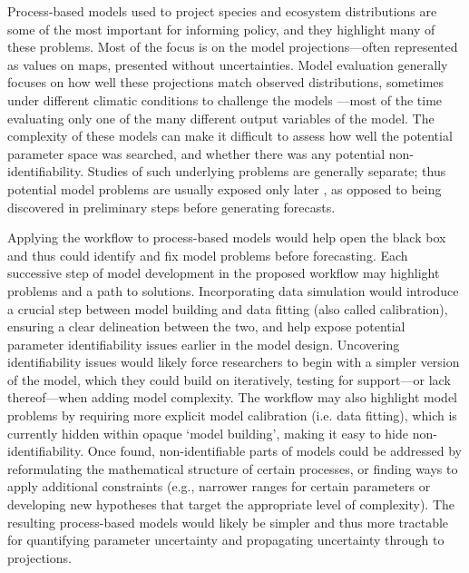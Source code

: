 \documentclass[11pt]{article}
\begin{document}
Process-based models used to project species and ecosystem distributions are some of the most important for informing policy, and they highlight many of these problems. Most of the focus is on the model projections---often represented as values on maps, presented without uncertainties. Model evaluation generally focuses on how well these projections match observed distributions, sometimes under different climatic conditions to challenge the models \citep{VanderMeersch2025a}---most of the time evaluating only one of the many different output variables of the model.
The complexity of these models can make it difficult to assess how well the potential parameter space was searched, and whether there was any potential non-identifiability. Studies of such underlying problems are generally separate; thus potential model problems are usually exposed only later \citep{VanderMeersch2025b}, as opposed to being discovered in preliminary steps before generating forecasts. 

Applying the workflow to process-based models would help open the black box and thus could identify and fix model problems before forecasting.
Each successive step of model development in the proposed workflow may highlight problems and a path to solutions. Incorporating data simulation would introduce a crucial step between model building and data fitting (also called calibration), ensuring a clear delineation between the two, and help expose potential parameter identifiability issues earlier in the model design. 
Uncovering identifiability issues would likely force researchers to begin with a simpler version of the model, which they could build on iteratively, testing for support---or lack thereof---when adding model complexity. The workflow may also highlight model problems by requiring more explicit model calibration (i.e. data fitting), which is currently hidden within opaque `model building', making it easy to hide non-identifiability. Once found, non-identifiable parts of models could be addressed by reformulating the mathematical structure of certain processes, or finding ways to apply additional constraints (e.g., narrower ranges for certain parameters or developing new hypotheses that target the appropriate level of complexity). The resulting process-based models would likely be simpler and thus more tractable for quantifying parameter uncertainty and propagating uncertainty through to projections. 
\end{document}
